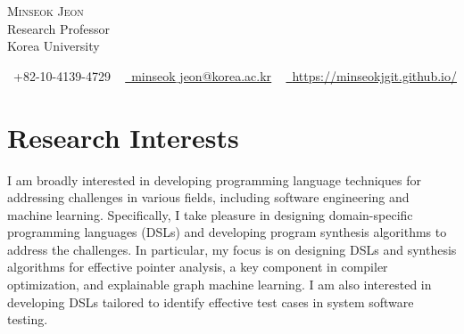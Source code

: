 \documentclass[letterpaper,11pt]{article}
\begin{document}

\begin{center}
    {\Huge \scshape Minseok Jeon} \\ \vspace{1pt}
    Research Professor\\\vspace{1pt}
    Korea University\\\vspace{1pt}
        
    \small \raisebox{-0.1\height}\faPhone\ +82-10-4139-4729 ~ \href{mailto:minseok_jeon@korea.ac.kr}{\raisebox{-0.2\height}\faEnvelope\  \underline{minseok$\_$jeon@korea.ac.kr}} ~ 
    \href{https://minseokjgit.github.io/}{\raisebox{-0.2\height}\faHome\ \underline{https://minseokjgit.github.io/}} 
    \vspace{-8pt}
\end{center}

\section{Research Interests}
I am broadly interested in developing programming language techniques for addressing challenges in various fields, including software engineering and machine learning.
%
Specifically, I take pleasure in designing domain-specific programming languages (DSLs) and developing program synthesis algorithms to address the challenges.
%
In particular, my focus is on designing DSLs and synthesis algorithms for effective pointer analysis, a key component in compiler optimization, and explainable graph machine learning. 
I am also interested in developing DSLs tailored to identify effective test cases in system software testing.
%
\end{document}
